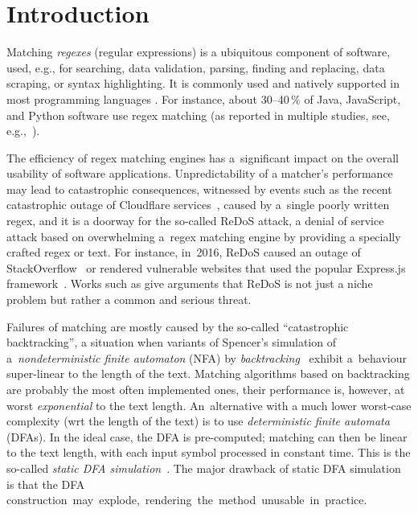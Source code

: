 \documentclass[acmsmall,screen]{acmart}
\begin{document}
\section{Introduction}\label{sec:intro}
%
%
Matching \emph{regexes} (regular expressions) is a ubiquitous component of software, 
used, e.g., for searching, data validation, parsing, finding and replacing, data
scraping, or syntax highlighting. It is commonly used and natively supported in most programming languages \cite{regexwiki}.
For instance, about 30--40\,\% of Java, JavaScript, and Python software use
regex matching (as reported in multiple studies, see, e.g.,~\cite{rethinkingregexes}).

The efficiency of regex matching engines has a~significant impact on the overall
usability of software applications.
%
Unpredictability of a matcher's performance may lead to catastrophic consequences,
witnessed by events such as the recent catastrophic outage of Cloudflare
services~\cite{cloudfareoutage}, 
caused by a~single poorly written regex,
and it is a doorway for the so-called ReDoS attack, 
a denial of service attack based on overwhelming a~regex matching engine by providing a specially crafted regex or text.
%
For instance, in~2016, ReDoS caused an outage of StackOverflow~\cite{stackoutage} 
or rendered vulnerable websites that used the popular Express.js framework~\cite{expressjsoutage}.
%
Works such as \cite{rethinkingregexes,redosimpact} give arguments that ReDoS is not just a niche problem but rather a common and serious threat.

Failures of matching are mostly caused by the so-called ``catastrophic
backtracking'', a situation when variants of Spencer's simulation of
a~\emph{nondeterministic finite automaton} (NFA) by
\emph{backtracking}~\cite{spencermatching} exhibit a~behaviour super-linear to
the length of the text.
Matching algorithms based on backtracking are probably the most often implemented ones,
their performance is, however, at worst \emph{exponential} to the text length.
%
An~alternative with a much lower worst-case complexity (wrt the length of the
text) is to use \emph{deterministic finite automata} (DFAs).
%
In the ideal case, the DFA is pre-computed; matching can then be linear to the text length, 
with each input symbol processed in constant time.
This is the so-called \emph{static DFA simulation}~\cite{sipser}. 
%
The major drawback of static DFA simulation is that the DFA \mbox{construction may explode,
rendering the method unusable in practice.}
\end{document}
